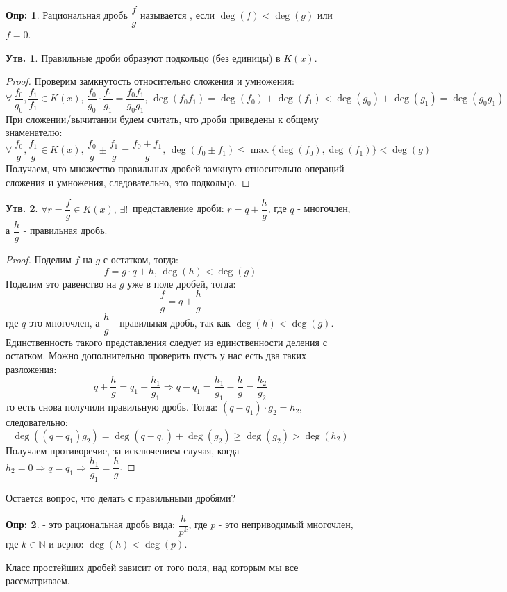 \documentclass[12pt]{article}
\newcommand{\MN}{\mathbb{N}}
\theoremstyle{definition}
\newtheorem{defn}{Опр:}
\newtheorem{prop}{Утв.}
\begin{document}
\begin{defn}
	Рациональная дробь $\dfrac{f}{g}$ называется , если $\deg(f) < \deg(g)$ или $f = 0$.
\end{defn}
\begin{prop}
	Правильные дроби образуют подкольцо (без единицы) в $K(x)$.
\end{prop}
\begin{proof}
	Проверим замкнутость относительно сложения и умножения:
	$$
		\forall \, \dfrac{f_0}{g_0}, \dfrac{f_1}{f_1} \in K(x), \, \dfrac{f_0}{g_0}{\cdot}\dfrac{f_1}{g_1} = \dfrac{f_0f_1}{g_0g_1}, \, \deg(f_0f_1) = \deg(f_0) + \deg(f_1) < \deg(g_0) + \deg(g_1) = \deg(g_0g_1)
	$$
	При сложении/вычитании будем считать, что дроби приведены к общему знаменателю:
	$$
		\forall \, \dfrac{f_0}{g}, \dfrac{f_1}{g} \in K(x), \, \dfrac{f_0}{g} \pm \dfrac{f_1}{g} = \dfrac{f_0 \pm f_1}{g}, \, \deg(f_0 \pm f_1) \leq \max\{\deg(f_0),\deg(f_1)\} < \deg(g)
	$$
	Получаем, что множество правильных дробей замкнуто относительно операций сложения и умножения, следовательно, это подкольцо.
\end{proof}
\newpage
\begin{prop}
	$\forall r = \dfrac{f}{g} \in K(x), \, \exists ! \,$ представление дроби: $r = q + \dfrac{h}{g}$, где $q$ - многочлен, а $\dfrac{h}{g}$ - правильная дробь.
\end{prop}
\begin{proof}
	Поделим $f$ на $g$ с остатком, тогда:
	$$
		f = g{\cdot}q + h, \, \deg(h) < \deg(g)
	$$
	Поделим это равенство на $g$ уже в поле дробей, тогда:
	$$
		\dfrac{f}{g} = q + \dfrac{h}{g}
	$$
	где $q$ это многочлен, а $\dfrac{h}{g}$ - правильная дробь, так как $\deg(h) < \deg(g)$. Единственность такого представления следует из единственности деления с остатком. Можно дополнительно проверить пусть у нас есть два таких разложения:
	$$
		q + \dfrac{h}{g} = q_1 + \dfrac{h_1}{g_1} \Rightarrow q - q_1 = \dfrac{h_1}{g_1} - \dfrac{h}{g} = \dfrac{h_2}{g_2}
	$$
	то есть снова получили правильную дробь. Тогда: $(q - q_1){\cdot}g_2 = h_2$, следовательно:
	$$
		\deg((q - q_1)g_2) = \deg(q - q_1) + \deg(g_2) \geq \deg(g_2) > \deg(h_2)
	$$
	Получаем противоречие, за исключением случая, когда $h_2 = 0 \Rightarrow q = q_1 \Rightarrow \dfrac{h_1}{g_1} = \dfrac{h}{g}$.
\end{proof}
Остается вопрос, что делать с правильными дробями? 
\begin{defn}
	 - это рациональная дробь вида: $\dfrac{h}{p^k}$, где $p$ - это неприводимый многочлен, где $k \in \MN$ и верно: $\deg(h) < \deg(p)$.
\end{defn}
Класс простейших дробей зависит от того поля, над которым мы все рассматриваем.
\end{document}
